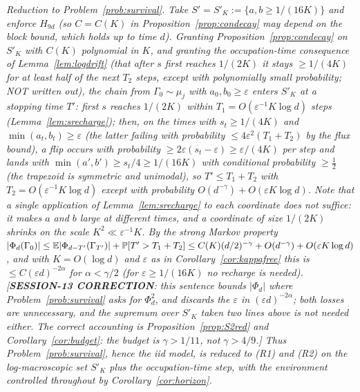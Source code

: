\emph{Reduction to Problem~\ref{prob:survival}.  Take
$S'=S'_K:=\{a,b\ge1/(16K)\}$ and enforce $H_{9d}$ (so $C=C(K)$ in
Proposition~\ref{prop:condecay} may depend on the block bound, which
holds up to time $d$).  Granting Proposition~\ref{prop:condecay} on
$S'_K$ with $C(K)$ polynomial in $K$, and granting the occupation-time
consequence of Lemma~\ref{lem:logdrift} (that after $s$ first reaches
$1/(2K)$ it stays $\ge1/(4K)$ for at least half of the next $T_2$
steps, except with polynomially small probability; NOT written out),
the chain from $\Gamma_0\sim\mu_j$ with $a_0,b_0\ge\varepsilon$ enters
$S'_K$ at a stopping time $T'$: first $s$ reaches $1/(2K)$ within
$T_1=O(\varepsilon^{-1}K\log d)$ steps (Lemma~\ref{lem:srecharge});
then, on the times with $s_t\ge1/(4K)$ and $\min(a_t,b_t)\ge\varepsilon$
(the latter failing with probability $\le4\varepsilon^2(T_1+T_2)$ by
the flux bound), a flip occurs with probability $\ge2\varepsilon(s_t-\varepsilon)
\ge\varepsilon/(4K)$ per step and lands with $\min(a',b')\ge s_t/4\ge1/(16K)$
with conditional probability $\ge\tfrac12$ (the trapezoid is
symmetric and unimodal), so $T'\le T_1+T_2$ with
$T_2=O(\varepsilon^{-1}K\log d)$ except with probability
$O(d^{-\gamma})+O(\varepsilon K\log d)$.  Note that a single
application of Lemma~\ref{lem:srecharge} to each coordinate does not
suffice: it makes $a$ and $b$ large at different times, and a
coordinate of size $1/(2K)$ shrinks on the scale $K^2\ll\varepsilon^{-1}K$.
By the strong Markov property
$|\Phi_d(\Gamma_0)|\le\mathbb{E}|\Phi_{d-T'}(\Gamma_{T'})|+\mathbb{P}[T'>T_1+T_2]
\le C(K)(d/2)^{-\gamma}+O(d^{-\gamma})+O(\varepsilon K\log d)$, and
with $K=O(\log d)$ and $\varepsilon$ as in Corollary~\ref{cor:kappafree}
this is $\le C(\varepsilon d)^{-2\alpha}$ for $\alpha<\gamma/2$ (for
$\varepsilon\ge1/(16K)$ no recharge is needed).  [\textbf{SESSION-13
CORRECTION}: this sentence bounds $|\Phi_d|$ where
Problem~\ref{prob:survival} asks for $\Phi_d^2$, and discards the
$\varepsilon$ in $(\varepsilon d)^{-2\alpha}$; both losses are
unnecessary, and the supremum over $S'_K$ taken two lines above is
not needed either.  The correct accounting is
Proposition~\ref{prop:S2red} and Corollary~\ref{cor:budget}: the
budget is $\gamma>1/11$, not $\gamma>4/9$.]  Thus
\emph{Problem~\ref{prob:survival}, hence the iid model, is reduced to
(R1) and (R2) on the log-macroscopic set $S'_K$ plus the
occupation-time step}, with the environment controlled throughout by
Corollary~\ref{cor:horizon}.}
